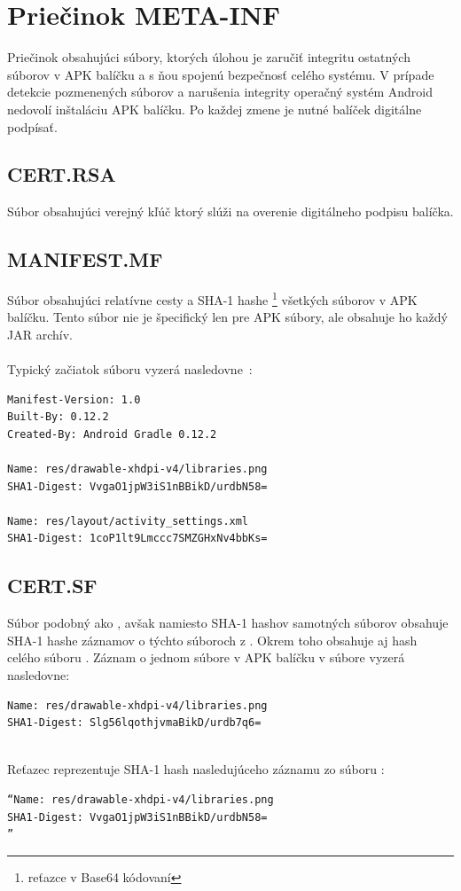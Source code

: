\section{Priečinok META-INF}
\label{META-INF}
Priečinok obsahujúci súbory, ktorých úlohou je zaručiť integritu ostatných súborov v APK balíčku a s ňou spojenú bezpečnosť celého systému. V prípade detekcie pozmenených súborov a narušenia integrity operačný systém Android nedovolí inštaláciu APK balíčku. Po každej zmene je nutné balíček digitálne podpísať.

\subsection*{CERT.RSA}
\label{CERT.RSA} 
Súbor obsahujúci verejný kľúč ktorý slúži na overenie digitálneho podpisu balíčka.
\subsection*{MANIFEST.MF}
\label{MANIFEST.MF}
Súbor obsahujúci relatívne cesty a SHA-1 hashe \footnote{reťazce v Base64 kódovaní} všetkých súborov v APK balíčku. Tento súbor nie je špecifický len pre APK súbory, ale obsahuje ho každý JAR archív.\\\\
Typický začiatok súboru  vyzerá nasledovne~\cite{Yang2015}: \\

\begin{verbatim}
Manifest-Version: 1.0
Built-By: 0.12.2
Created-By: Android Gradle 0.12.2

Name: res/drawable-xhdpi-v4/libraries.png
SHA1-Digest: VvgaO1jpW3iS1nBBikD/urdbN58=

Name: res/layout/activity_settings.xml
SHA1-Digest: 1coP1lt9Lmccc7SMZGHxNv4bbKs=
\end{verbatim}

\subsection*{CERT.SF}
\label{CERT.SF}
Súbor podobný ako , avšak namiesto SHA-1 hashov samotných súborov obsahuje SHA-1 hashe záznamov o týchto súboroch z . Okrem toho obsahuje aj hash celého súboru . \newline Záznam o jednom súbore v APK balíčku v súbore  vyzerá nasledovne: \newline
\begin{verbatim}
Name: res/drawable-xhdpi-v4/libraries.png
SHA1-Digest: Slg56lqothjvmaBikD/urdb7q6=
\end{verbatim}\mbox{}\\
Reťazec  reprezentuje SHA-1 hash nasledujúceho záznamu zo súboru :\mbox{}\\
\begin{verbatim}
“Name: res/drawable-xhdpi-v4/libraries.png
SHA1-Digest: VvgaO1jpW3iS1nBBikD/urdbN58=
”\end{verbatim}

